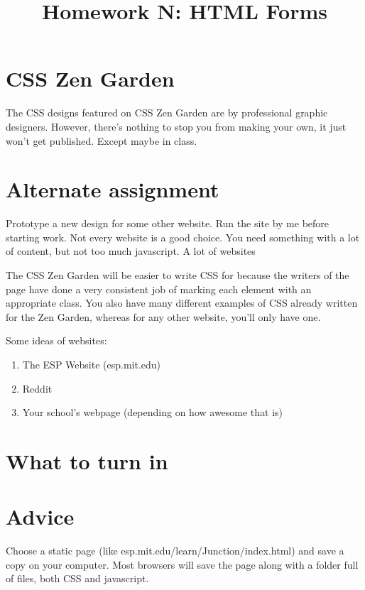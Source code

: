 \documentclass{article}
\title{Homework N:  HTML Forms}
\begin{document}
\maketitle

\section*{CSS Zen Garden}
The CSS designs featured on CSS Zen Garden are by professional graphic designers.  However, there's nothing to stop you from making your own, it just won't get published.  Except maybe in class.


\section*{Alternate assignment}
Prototype a new design for some other website.  Run the site by me before starting work.  Not every website is a good choice.  You need something with a lot of content, but not too much javascript.  A lot of websites 

The CSS Zen Garden will be easier to write CSS for because the writers of the page have done a very consistent job of marking each element with an appropriate class.  You also have many different examples of CSS already written for the Zen Garden, whereas for any other website, you'll only have one.

Some ideas of websites:
\begin{enumerate}
\item The ESP Website (esp.mit.edu)
\item Reddit
\item Your school's webpage (depending on how awesome that is)
\end{enumerate}

\section*{What to turn in}

\section*{Advice}

Choose a static page (like esp.mit.edu/learn/Junction/index.html) and save a copy on your computer.  Most browsers will save the page along with a folder full of files, both CSS and javascript.
\end{document}
